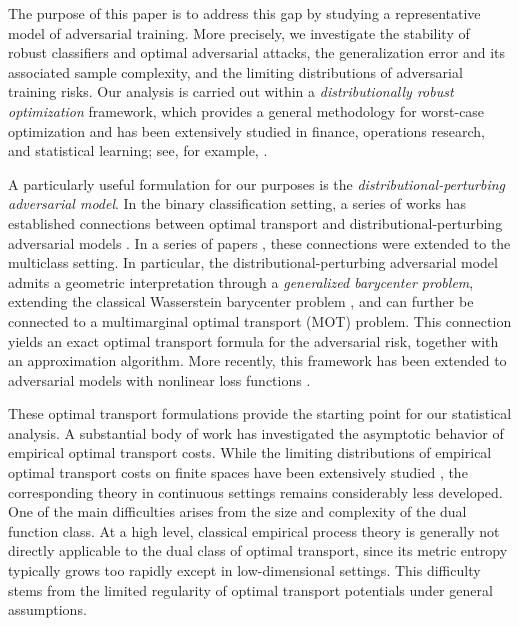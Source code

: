 \documentclass{amsart}
\theoremstyle{plain}
\numberwithin{equation}{section}\newtheorem{theorem}{Theorem}[section]
\theoremstyle{remark}
\begin{document}
The purpose of this paper is to address this gap by studying a representative model of adversarial training. More precisely, we investigate the stability of robust classifiers and optimal adversarial attacks, the generalization error and its associated sample complexity, and the limiting distributions of adversarial training risks. Our analysis is carried out within a \emph{distributionally robust optimization} framework, which provides a general methodology for worst-case optimization and has been extensively studied in finance, operations research, and statistical learning; see, for example, \cite{delage2010distributionally, mohajerin2018data, kuhn2019wasserstein, MR3959085, MR4015639, blanchet2023unifying, wang2024outlier, Kuhn_Shafiee_Wiesemann_2025}.




A particularly useful formulation for our purposes is the \emph{distributional-perturbing adversarial model}. In the binary classification setting, a series of works has established connections between optimal transport and distributional-perturbing adversarial models \cite{Bhagoji2019LowerBO, Pydi2021AdversarialRV, pydi2021the, dai2023characterizing, Trillos2020AdversarialCN, NEURIPS2023_81858558, JMLR:v25:23-0456, frank2025adversarialsurrogateriskbounds}. In a series of papers \cite{jakwang_MOT, jakwang_2024existence, trillos2024optimal}, these connections were extended to the multiclass setting. In particular, the distributional-perturbing adversarial model admits a geometric interpretation through a \emph{generalized barycenter problem}, extending the classical Wasserstein barycenter problem \cite{Carlier2010MatchingFT, Agueh_Carlier2011}, and can further be connected to a multimarginal optimal transport (MOT) problem. This connection yields an exact optimal transport formula for the adversarial risk, together with an approximation algorithm. More recently, this framework has been extended to adversarial models with nonlinear loss functions \cite{trillos2025lowerboundsadversarialrobustness}.





These optimal transport formulations provide the starting point for our statistical analysis. A substantial body of work has investigated the asymptotic behavior of empirical optimal transport costs. While the limiting distributions of empirical optimal transport costs on finite spaces have been extensively studied \cite{Sommerfeld_Munk2018, Klatt_etc2022, asymptotic_LP2023, CLT_semidiscrete_OT2024}, the corresponding theory in continuous settings remains considerably less developed. One of the main difficulties arises from the size and complexity of the dual function class. At a high level, classical empirical process theory is generally not directly applicable to the dual class of optimal transport, since its metric entropy typically grows too rapidly except in low-dimensional settings. This difficulty stems from the limited regularity of optimal transport potentials under general assumptions.
\end{document}
